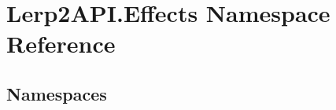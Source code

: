 \hypertarget{namespace_lerp2_a_p_i_1_1_effects}{}\section{Lerp2\+A\+P\+I.\+Effects Namespace Reference}
\label{namespace_lerp2_a_p_i_1_1_effects}
\subsection*{Namespaces}
\begin{DoxyCompactItemize}
\end{DoxyCompactItemize}
